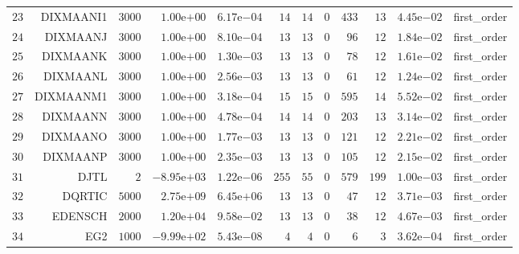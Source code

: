 \begin{longtable}{rrrrrrrrrrrr}
  \(    23\) & DIXMAANI1 & \(  3000\) & \( 1.00\)e\(+00\) & \( 6.17\)e\(-04\) & \(    14\) & \(    14\) & \(     0\) & \(   433\) & \(    13\) & \( 4.45\)e\(-02\) & first\_order \\
  \(    24\) & DIXMAANJ & \(  3000\) & \( 1.00\)e\(+00\) & \( 8.10\)e\(-04\) & \(    13\) & \(    13\) & \(     0\) & \(    96\) & \(    12\) & \( 1.84\)e\(-02\) & first\_order \\
  \(    25\) & DIXMAANK & \(  3000\) & \( 1.00\)e\(+00\) & \( 1.30\)e\(-03\) & \(    13\) & \(    13\) & \(     0\) & \(    78\) & \(    12\) & \( 1.61\)e\(-02\) & first\_order \\
  \(    26\) & DIXMAANL & \(  3000\) & \( 1.00\)e\(+00\) & \( 2.56\)e\(-03\) & \(    13\) & \(    13\) & \(     0\) & \(    61\) & \(    12\) & \( 1.24\)e\(-02\) & first\_order \\
  \(    27\) & DIXMAANM1 & \(  3000\) & \( 1.00\)e\(+00\) & \( 3.18\)e\(-04\) & \(    15\) & \(    15\) & \(     0\) & \(   595\) & \(    14\) & \( 5.52\)e\(-02\) & first\_order \\
  \(    28\) & DIXMAANN & \(  3000\) & \( 1.00\)e\(+00\) & \( 4.78\)e\(-04\) & \(    14\) & \(    14\) & \(     0\) & \(   203\) & \(    13\) & \( 3.14\)e\(-02\) & first\_order \\
  \(    29\) & DIXMAANO & \(  3000\) & \( 1.00\)e\(+00\) & \( 1.77\)e\(-03\) & \(    13\) & \(    13\) & \(     0\) & \(   121\) & \(    12\) & \( 2.21\)e\(-02\) & first\_order \\
  \(    30\) & DIXMAANP & \(  3000\) & \( 1.00\)e\(+00\) & \( 2.35\)e\(-03\) & \(    13\) & \(    13\) & \(     0\) & \(   105\) & \(    12\) & \( 2.15\)e\(-02\) & first\_order \\
  \(    31\) & DJTL & \(     2\) & \(-8.95\)e\(+03\) & \( 1.22\)e\(-06\) & \(   255\) & \(    55\) & \(     0\) & \(   579\) & \(   199\) & \( 1.00\)e\(-03\) & first\_order \\
  \(    32\) & DQRTIC & \(  5000\) & \( 2.75\)e\(+09\) & \( 6.45\)e\(+06\) & \(    13\) & \(    13\) & \(     0\) & \(    47\) & \(    12\) & \( 3.71\)e\(-03\) & first\_order \\
  \(    33\) & EDENSCH & \(  2000\) & \( 1.20\)e\(+04\) & \( 9.58\)e\(-02\) & \(    13\) & \(    13\) & \(     0\) & \(    38\) & \(    12\) & \( 4.67\)e\(-03\) & first\_order \\
  \(    34\) & EG2 & \(  1000\) & \(-9.99\)e\(+02\) & \( 5.43\)e\(-08\) & \(     4\) & \(     4\) & \(     0\) & \(     6\) & \(     3\) & \( 3.62\)e\(-04\) & first\_order \\

\end{longtable}
